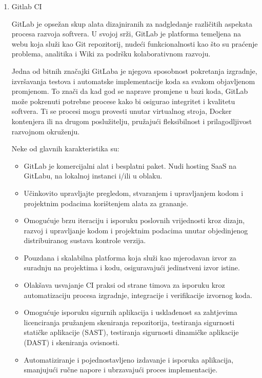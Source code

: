 \documentclass[a4paper,12pt,oneside]{article}
\begin{document}
\begin{enumerate}

\item 
Gitlab CI

GitLab je opsežan skup alata dizajniranih za nadgledanje različitih aspekata procesa razvoja softvera. U svojoj srži, GitLab je platforma temeljena na webu koja služi kao Git repozitorij, nudeći funkcionalnosti kao što su praćenje problema, analitika i Wiki za podršku kolaborativnom razvoju.

Jedna od bitnih značajki GitLaba je njegova sposobnost pokretanja izgradnje, izvršavanja testova i automatske implementacije koda sa svakom objavljenom promjenom. To znači da kad god se naprave promjene u bazi koda, GitLab može pokrenuti potrebne procese kako bi osigurao integritet i kvalitetu softvera. Ti se procesi mogu provesti unutar virtualnog stroja, Docker kontenjera ili na drugom poslužitelju, pružajući fleksibilnost i prilagodljivost razvojnom okruženju.

Neke od glavnih karakteristika su:
\begin{itemize}
\item GitLab je komercijalni alat i besplatni paket. Nudi hosting SaaS na GitLabu, na lokalnoj instanci i/ili u oblaku.
\item Učinkovito upravljajte pregledom, stvaranjem i upravljanjem kodom i projektnim podacima korištenjem alata za grananje.
\item Omogućuje brzu iteraciju i isporuku poslovnih vrijednosti kroz dizajn, razvoj i upravljanje kodom i projektnim podacima unutar objedinjenog distribuiranog sustava kontrole verzija.
\item Pouzdana i skalabilna platforma koja služi kao mjerodavan izvor za suradnju na projektima i kodu, osiguravajući jedinstveni izvor istine.
\item Olakšava usvajanje CI praksi od strane timova za isporuku kroz automatizaciju procesa izgradnje, integracije i verifikacije izvornog koda.
\item Omogućuje isporuku sigurnih aplikacija i usklađenost sa zahtjevima licenciranja pružanjem skeniranja repozitorija, testiranja sigurnosti statičke aplikacije (SAST), testiranja sigurnosti dinamičke aplikacije (DAST) i skeniranja ovisnosti.
\item Automatiziranje i pojednostavljeno izdavanje i isporuka aplikacija, smanjujući ručne napore i ubrzavajući proces implementacije.
\end{itemize}


\end{enumerate}
\end{document}
